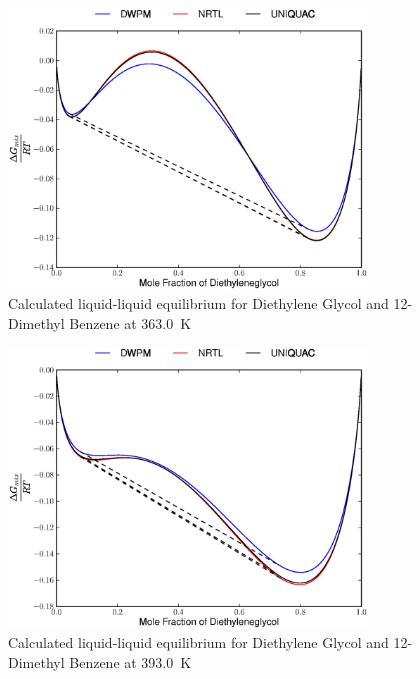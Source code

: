 \begin{figure}[hp]
\centering
\includegraphics[width = 0.85\textwidth]{Results_Parts/BinaryParams/diethyleneglycol-12-dimethylbenzene/AllModelsGibbsPlots/T_363.0.eps}
\caption{Calculated liquid-liquid equilibrium for Diethylene Glycol and 12-Dimethyl Benzene at 363.0~$\mathrm{K}$} 
\end{figure}

\begin{figure}[hp]
\centering
\includegraphics[width = 0.85\textwidth]{Results_Parts/BinaryParams/diethyleneglycol-12-dimethylbenzene/AllModelsGibbsPlots/T_393.0.eps}
\caption{Calculated liquid-liquid equilibrium for Diethylene Glycol and 12-Dimethyl Benzene at 393.0~$\mathrm{K}$} 
\end{figure}

\clearpage



